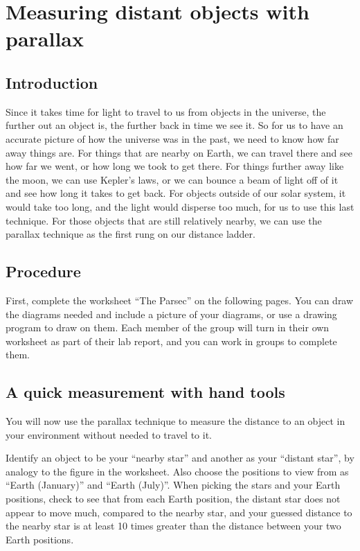 \chapter{Measuring distant objects with parallax}


\section{Introduction}

Since it takes time for light to travel to us from objects in the universe, the further out an object is, the further back in time we see it. So for us to have an accurate picture of how the universe was in the past, we need to know how far away things are. For things that are nearby on Earth, we can travel there and see how far we went, or how long we took to get there. For things further away like the moon, we can use Kepler's laws, or we can bounce a beam of light off of it and see how long it takes to get back. For objects outside of our solar system, it would take too long, and the light would disperse too much, for us to use this last technique. For those objects that are still relatively nearby, we can use the parallax technique as the first rung on our distance ladder.

\section{Procedure}

First, complete the worksheet ``The Parsec'' on the following pages. You can draw the diagrams needed and include a picture of your diagrams, or use a drawing program to draw on them. Each member of the group will turn in their own worksheet as part of their lab report, and you can work in groups to complete them.



\section{A quick measurement with hand tools}

You will now use the parallax technique to measure the distance to an object in your environment without needed to travel to it.

\begin{steps}
	\item Identify an object to be your ``nearby star'' and another as your ``distant star'', by analogy to the figure in the worksheet. Also choose the positions to view from as ``Earth (January)'' and ``Earth (July)''. When picking the stars and your Earth positions, check to see that from each Earth position, the distant star does not appear to move much, compared to the nearby star, and your guessed distance to the nearby star is at least 10 times greater than the distance between your two Earth positions.
\end{steps}
	

